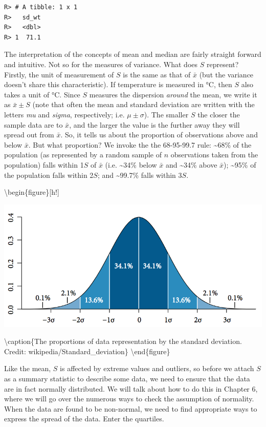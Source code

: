 \documentclass[english,10pt,a4paper,oneside]{book}
\theoremstyle{definition}
\theoremstyle{definition}
\theoremstyle{definition}
\theoremstyle{remark}
\begin{document}
\begin{verbatim}
R> # A tibble: 1 x 1
R>   sd_wt
R>   <dbl>
R> 1  71.1
\end{verbatim}

The interpretation of the concepts of mean and median are fairly
straight forward and intuitive. Not so for the measures of variance.
What does \(S\) represent? Firstly, the unit of measurement of \(S\) is
the same as that of \(\bar{x}\) (but the variance doesn't share this
characteristic). If temperature is measured in °C, then \(S\) also takes
a unit of °C. Since \(S\) measures the dispersion \emph{around} the
mean, we write it as \(\bar{x} \pm S\) (note that often the mean and
standard deviation are written with the letters \emph{mu} and
\emph{sigma}, respectively; i.e. \(\mu \pm \sigma\)). The smaller \(S\)
the closer the sample data are to \(\bar{x}\), and the larger the value
is the further away they will spread out from \(\bar{x}\). So, it tells
us about the proportion of observations above and below \(\bar{x}\). But
what proportion? We invoke the the 68-95-99.7 rule:
\textasciitilde{}68\% of the population (as represented by a random
sample of \(n\) observations taken from the population) falls within
1\(S\) of \(\bar{x}\) (i.e. \textasciitilde{}34\% below \(\bar{x}\) and
\textasciitilde{}34\% above \(\bar{x}\)); \textasciitilde{}95\% of the
population falls within 2\(S\); and \textasciitilde{}99.7\% falls within
3\(S\).

\textbackslash{}begin\{figure\}{[}h!{]}

\begin{center}
\includegraphics[width=0.7\linewidth]{figures/Standard_deviation_diagram.png}
\end{center}

\textbackslash{}caption\{The proportions of data representation by the
standard deviation. Credit: wikipedia/Standard\_deviation\}
\textbackslash{}end\{figure\}

Like the mean, \(S\) is affected by extreme values and outliers, so
before we attach \(S\) as a summary statistic to describe some data, we
need to ensure that the data are in fact normally distributed. We will
talk about how to do this in Chapter 6, where we will go over the
numerous ways to check the assumption of normality. When the data are
found to be non-normal, we need to find appropriate ways to express the
spread of the data. Enter the quartiles.
\end{document}
